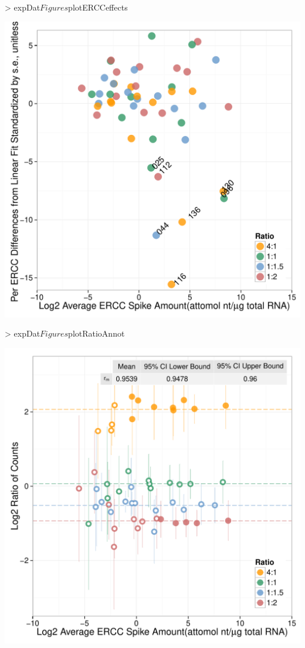 \documentclass{article}
\begin{document}
\begin{center}
\begin{Schunk}
\begin{Sinput}
> expDat$Figures$plotERCCeffects
\end{Sinput}
\end{Schunk}
\includegraphics{erccdashboardVignette-printPanelE}
\end{center}
\begin{center}
\begin{Schunk}
\begin{Sinput}
> expDat$Figures$plotRatioAnnot
\end{Sinput}
\end{Schunk}
\includegraphics{erccdashboardVignette-printPanelF}
\end{center}
\end{document}
